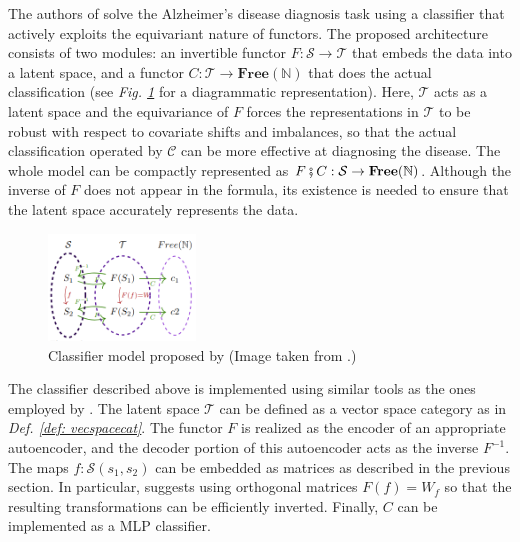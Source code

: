 \documentclass[11pt,a4paper,openright,twoside]{report}
\theoremstyle{plain}
\theoremstyle{definition}
\begin{document}
The authors of \cite{chytas2024poolingimagedatasetsmultiple} solve the Alzheimer's disease diagnosis task using a classifier that actively exploits the equivariant nature of functors. The proposed architecture consists of two modules: an invertible functor $F: \mathcal{S} \to \mathcal{T}$ that embeds the data into a latent space, and a functor $C: \mathcal{T} \to \mathbf{Free}(\mathbb{N})$ that does the actual classification (see \textit{Fig. \ref{fig: classifier}} for a diagrammatic representation). Here, $\mathcal{T}$ acts as a latent space and the equivariance of $F$ forces the representations in $\mathcal{T}$ to be robust with respect to covariate shifts and imbalances, so that the actual classification operated by $\mathcal{C}$ can be more effective at diagnosing the disease. The whole model can be compactly represented as $F \fatsemi C: \mathcal{S} \to \mathbf{Free}(\mathbb{N})$. Although the inverse of $F$ does not appear in the formula, its existence is needed to ensure that the latent space accurately represents the data.

\begin{figure}[h]
  \begin{center}
    \includegraphics[width=0.35\textwidth]{figures/classifier.png}     
    \caption[Classifier]{Classifier model proposed by \cite{chytas2024poolingimagedatasetsmultiple} (Image taken from \cite{chytas2024poolingimagedatasetsmultiple}.)}
    \label{fig: classifier}
  \end{center}
\end{figure}



The classifier described above is implemented using similar tools as the ones employed by \cite{sheshmani2021categorical}. The latent space $\mathcal{T}$ can be defined as a vector space category as in \textit{Def. \ref{def: vecspacecat}}. The functor $F$ is realized as the encoder of an appropriate autoencoder, and the decoder portion of this autoencoder acts as the inverse $F^{-1}$. The maps $f: \mathcal{S}(s_1,s_2)$ can be embedded as matrices as described in the previous section. In particular, \cite{chytas2024poolingimagedatasetsmultiple}  suggests using orthogonal matrices $F(f) = W_f$ so that the resulting transformations can be efficiently inverted.
Finally, $C$ can be implemented as a MLP classifier.
\end{document}

